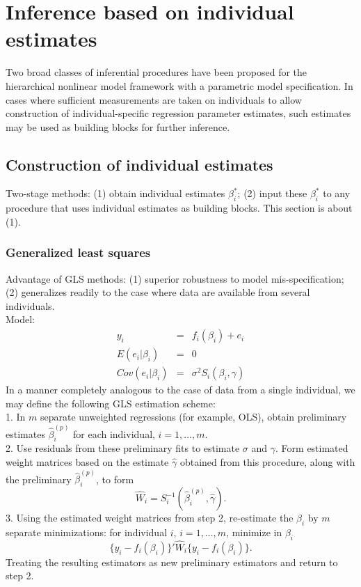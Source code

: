 \section{Inference based on individual estimates}
Two broad classes of inferential procedures have been proposed for the hierarchical nonlinear model framework with a parametric model specification. In cases where sufficient measurements are taken on individuals to allow construction of individual-specific regression parameter estimates, such estimates may be used as building blocks for further inference.
\subsection{Construction of individual estimates}
Two-stage methods: (1) obtain individual estimates $\beta_i^*$; (2) input these $\beta_i^*$ to any procedure that uses individual estimates as building blocks. This section is about (1).
\subsubsection{Generalized least squares}
Advantage of GLS methods: (1) superior robustness to model mis-specification; (2) generalizes readily to the case where data are available from several individuals. \\
Model:
\begin{equation}
  \begin{array}{rcl}
    y_i & = & f_i(\beta_i)+e_i \\
    E(e_i|\beta_i) & = & 0 \\
    Cov(e_i|\beta_i) & = & \sigma^2S_i(\beta_i,\gamma)
  \end{array}
\end{equation}
In a manner completely analogous to the case of data from a single individual, we may define the following GLS estimation scheme: \\
1. In $m$ separate unweighted regressions (for example, OLS), obtain preliminary estimates $\hat{\beta}_i^{(p)}$ for each individual, $i = 1,\ldots,m$. \\
2. Use residuals from these preliminary fits to estimate $\sigma$ and $\gamma$. Form estimated weight matrices based on the estimate $\hat{\gamma}$ obtained from this procedure, along with the preliminary $\hat{\beta}_i^{(p)}$, to form
\begin{equation}
  \hat{W}_i=S_i^{-1}(\hat{\beta}_i^{(p)},\hat{\gamma}).
\end{equation}
3. Using the estimated weight matrices from step 2, re-estimate the $\beta_i$ by $m$ separate minimizations: for individual $i$, $i = 1,\ldots,m$, minimize in $\beta_i$
\begin{equation}
  \{y_i-f_i(\beta_i)\}'\hat{W}_i\{y_i-f_i(\beta_i)\}.
\end{equation}
Treating the resulting estimators as new preliminary estimators and return to step 2.
